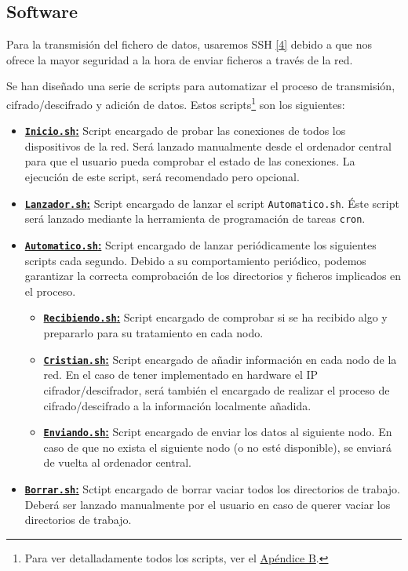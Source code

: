 \subsection{Software}
Para la transmisión del fichero de datos, usaremos SSH \hyperlink{4}{[4]} debido a que nos ofrece la mayor seguridad a la hora de enviar ficheros a través de la red.

Se han diseñado una serie de scripts para automatizar el proceso de transmisión, cifrado/descifrado y adición de datos. Estos scripts\footnote{Para ver detalladamente todos los scripts, ver el \hyperlink{Scripts}{Apéndice B}.} son los siguientes:
\begin{itemize}
	\item \hyperlink{ScriptConexion}{\textbf{\texttt{Inicio.sh}:}} Script encargado de probar las conexiones de todos los dispositivos de la red. Será lanzado manualmente desde el ordenador central para que el usuario pueda comprobar el estado de las conexiones. La ejecución de este script, será recomendado pero opcional.
	\item \hyperlink{ScriptLanzador}{\textbf{\texttt{Lanzador.sh}:}} Script encargado de lanzar el script \texttt{Automatico.sh}. Éste script será lanzado mediante la herramienta de programación de tareas \texttt{cron}.
	\item \hyperlink{ScriptAutomatico}{\textbf{\texttt{Automatico.sh}:}} Script encargado de lanzar periódicamente los siguientes scripts cada segundo. Debido a su comportamiento periódico, podemos garantizar la correcta comprobación de los directorios y ficheros implicados en el proceso.
	\begin{itemize}
		\item \hyperlink{ScriptRecibiendo}{\textbf{\texttt{Recibiendo.sh}:}} Script encargado de comprobar si se ha recibido algo y prepararlo para su tratamiento en cada nodo.
		\item \hyperlink{ScriptCristian}{\textbf{\texttt{Cristian.sh}:}} Script encargado de añadir información en cada nodo de la red. En el caso de tener implementado en hardware el IP cifrador/descifrador, será también el encargado de realizar el proceso de cifrado/descifrado a la información localmente añadida.
		\item \hyperlink{ScriptEnviando}{\textbf{\texttt{Enviando.sh}:}} Script encargado de enviar los datos al siguiente nodo. En caso de que no exista el siguiente nodo (o no esté disponible), se enviará de vuelta al ordenador central.
	\end{itemize}
	\item \hyperlink{ScriptBorrar}{\textbf{\texttt{Borrar.sh}:}} Sctipt encargado de borrar vaciar todos los directorios de trabajo. Deberá ser lanzado manualmente por el usuario en caso de querer vaciar los directorios de trabajo.
\end{itemize}

